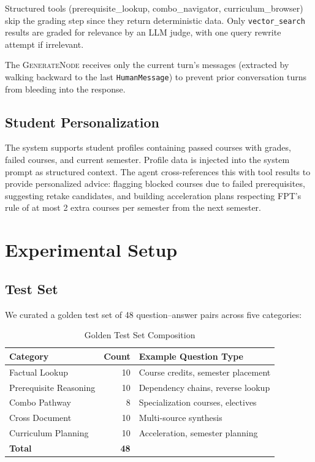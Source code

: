 \documentclass[lettersize,journal]{IEEEtran}
\begin{document}
Structured tools (prerequisite\_lookup, combo\_navigator, curriculum\_browser) skip the grading step since they return deterministic data. Only \texttt{vector\_search} results are graded for relevance by an LLM judge, with one query rewrite attempt if irrelevant.

The \textsc{GenerateNode} receives only the current turn's messages (extracted by walking backward to the last \texttt{HumanMessage}) to prevent prior conversation turns from bleeding into the response.

\subsection{Student Personalization}

The system supports student profiles containing passed courses with grades, failed courses, and current semester. Profile data is injected into the system prompt as structured context. The agent cross-references this with tool results to provide personalized advice: flagging blocked courses due to failed prerequisites, suggesting retake candidates, and building acceleration plans respecting FPT's rule of at most 2 extra courses per semester from the next semester.

\section{Experimental Setup}

\subsection{Test Set}

We curated a golden test set of 48 question--answer pairs across five categories:

\begin{table}[!t]
\caption{Golden Test Set Composition\label{tab:testset}}
\centering
\begin{tabular}{lrl}
\toprule
\textbf{Category} & \textbf{Count} & \textbf{Example Question Type} \\
\midrule
Factual Lookup & 10 & Course credits, semester placement \\
Prerequisite Reasoning & 10 & Dependency chains, reverse lookup \\
Combo Pathway & 8 & Specialization courses, electives \\
Cross Document & 10 & Multi-source synthesis \\
Curriculum Planning & 10 & Acceleration, semester planning \\
\midrule
\textbf{Total} & \textbf{48} & \\
\bottomrule
\end{tabular}
\end{table}
\end{document}

